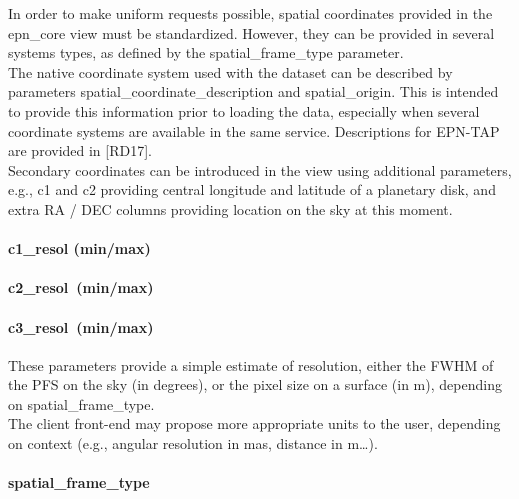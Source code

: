 \documentclass[11pt,a4paper]{ivoa}
\begin{document}
In order to make uniform requests possible, spatial coordinates provided in the epn\_core view must be standardized. However, they can be provided in several systems types, as defined by the spatial\_frame\_type parameter. \\The native coordinate system used with the dataset can be described by parameters spatial\_coordinate\_description and spatial\_origin. This is intended to provide this information prior to loading the data, especially when several coordinate systems are available in the same service. Descriptions for EPN-TAP are provided in [RD17]. \\ Secondary coordinates can be introduced in the view using additional parameters, e.g., c1 and c2 providing central longitude and latitude of a planetary disk, and extra RA / DEC columns providing location on the sky at this moment.

\paragraph{c1\_resol (min/max)}

\paragraph{c2\_resol (min/max)}

\paragraph{c3\_resol (min/max)}

These parameters provide a simple estimate of resolution, either the FWHM of the PFS on the sky (in degrees), or the pixel size on a surface (in m), depending on spatial\_frame\_type. \\ The client front-end may propose more appropriate units to the user, depending on context (e.g., angular resolution in mas, distance in m…).

\paragraph{spatial\_frame\_type}
\end{document}
